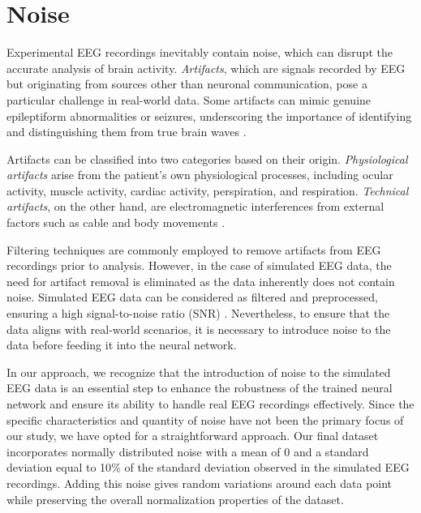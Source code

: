 \documentclass[a4paper, UKenglish, 11pt]{uiomaster}
\begin{document}
\section{Noise} \label{chap:noise}
Experimental EEG recordings inevitably contain noise, which can disrupt the accurate analysis of brain activity. \emph{Artifacts}, which are signals recorded by EEG but originating from sources other than neuronal communication, pose a particular challenge in real-world data. Some artifacts can mimic genuine epileptiform abnormalities or seizures, underscoring the importance of identifying and distinguishing them from true brain waves \cite{sazgar2019eeg}.

Artifacts can be classified into two categories based on their origin. \emph{Physiological artifacts} arise from the patient's own physiological processes, including ocular activity, muscle activity, cardiac activity, perspiration, and respiration. \emph{Technical artifacts}, on the other hand, are electromagnetic interferences from external factors such as cable and body movements \cite{bitbrain}.

Filtering techniques are commonly employed to remove artifacts from EEG recordings prior to analysis. However, in the case of simulated EEG data, the need for artifact removal is eliminated as the data inherently does not contain noise. Simulated EEG data can be considered as filtered and preprocessed, ensuring a high signal-to-noise ratio (SNR) \cite{wiki-snr}. Nevertheless, to ensure that the data aligns with real-world scenarios, it is necessary to introduce noise to the data before feeding it into the neural network.

In our approach, we recognize that the introduction of noise to the simulated EEG data is an essential step to enhance the robustness of the trained neural network and ensure its ability to handle real EEG recordings effectively. Since the specific characteristics and quantity of noise have not been the primary focus of our study, we have opted for a straightforward approach. Our final dataset incorporates normally distributed noise with a mean of 0 and a standard deviation equal to 10$\%$ of the standard deviation observed in the simulated EEG recordings. Adding this noise gives random variations around each data point while preserving the overall normalization properties of the dataset.
\end{document}
